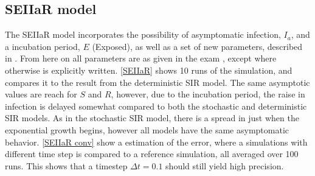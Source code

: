 \documentclass{article}
\begin{document}
    \subsection*{SEIIaR model}
    The SEIIaR model incorporates the possibility of asymptomatic infection, $I_a$, and a incubation period, $E$ (Exposed), as well as a set of new parameters, described in \cite{exam}.
    From here on all parameters are as given in the exam \cite{exam}, except where otherwise is explicitly written.
    \autoref{SEIIaR} shows 10 runs of the simulation, and compares it to the result from the deterministic SIR model.
    The same asymptotic values are reach for $S$ and $R$, however, due to the incubation period, the raise in infection is delayed somewhat compared to both the stochastic and deterministic SIR models.
    As in the stochastic SIR model, there is a spread in just when the exponential growth begins, however all models have the same asymptomatic behavior.
    \autoref{SEIIaR conv} show a estimation of the error, where a simulations with different time step is compared to a reference simulation, all averaged over 100 runs.
    This shows that a timestep $\Delta t = 0.1$ should still yield high precision.
\end{document}
